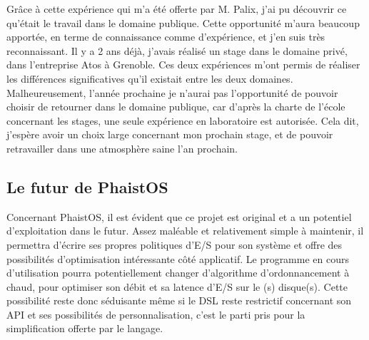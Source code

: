 Grâce à cette expérience qui m'a été offerte par M. Palix, j'ai pu découvrir ce 
qu'était le travail dans le domaine publique. Cette opportunité m'aura beaucoup 
apportée, en terme de connaissance comme d'expérience, et j'en suis très 
reconnaissant. Il y a 2 ans déjà, j'avais réalisé un stage dans le domaine 
privé, dans l'entreprise Atos à Grenoble. Ces deux expériences m'ont permis de 
réaliser les différences significatives qu'il existait entre les deux domaines. 
Malheureusement, l'année prochaine je n'aurai pas l'opportunité de pouvoir 
choisir de retourner dans le domaine publique, car d'après la charte de l'école 
concernant les stages, une seule expérience en laboratoire est autorisée. Cela 
dit, j'espère avoir un choix large concernant mon prochain stage, et de pouvoir 
retravailler dans une atmosphère saine l'an prochain.

\subsection{Le futur de PhaistOS}

Concernant PhaistOS, il est évident que ce projet est original et a un 
potentiel d'exploitation dans le futur. Assez maléable et relativement simple à 
maintenir, il permettra d'écrire ses propres politiques d'E/S pour son système 
et offre des possibilités d'optimisation intéressante côté applicatif. Le 
programme en cours d'utilisation pourra potentiellement changer d'algorithme 
d'ordonnancement à chaud, pour optimiser son débit et sa latence d'E/S sur le
(s) disque(s). Cette possibilité reste donc séduisante même si le DSL reste 
restrictif concernant son API et ses possibilités de personnalisation, c'est le 
parti pris pour la simplification offerte par le langage.
